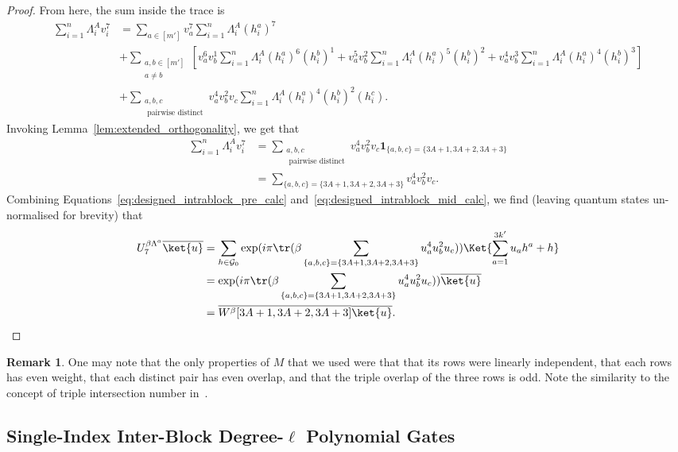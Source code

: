 \documentclass[11pt]{article}
\theoremstyle{definition}
\newtheorem{remark}[theorem]{Remark}
\newcommand{\cG}{\mathcal{G}}
\newcommand{\one}{\boldsymbol{1}}
\newcommand*{\ol}{\overline}
\begin{document}
\begin{proof}
From here, the sum inside the trace is
\begin{align}
    \sum_{i=1}^n\Lambda^A_i
     v_i^7
     &= \sum_{a\in [m']} v_a^7 \sum_{i=1}^n\Lambda^A_i(h^a_i)^7  \\
     &+ \sum_{\substack{a,b \in [m']\\a \neq b}}\left[v_a^6v_b^1 \sum_{i=1}^n\Lambda^A_i(h^a_i)^6(h^b_i)^1 + v_a^5v_b^2 \sum_{i=1}^n\Lambda^A_i(h^a_i)^5(h^b_i)^2 + 
    v_a^4v_b^3 \sum_{i=1}^n\Lambda^A_i(h^a_i)^4(h^b_i)^3\right] \\
    &+ \sum_{\substack{a,b,c \\\text{ pairwise distinct}}}v_a^4v_b^2v_c \sum_{i=1}^n\Lambda^A_i(h^a_i)^4(h^b_i)^2(h^c_i).
\end{align}
Invoking Lemma~\ref{lem:extended_orthogonality}, we get that 
\begin{align}
    \sum_{i=1}^n\Lambda^A_i
     v_i^7
     &=  \sum_{\substack{a,b,c \\\text{ pairwise distinct}}}v_a^4v_b^2v_c \one_{\{a,b,c\} = \{3A+1,3A+2,3A+3\}} \\
     &= \sum_{\{a,b,c\} = \{3A+1,3A+2,3A+3\}}v_a^4v_b^2v_c.\label{eq:designed_intrablock_mid_calc}
\end{align}
Combining Equations~\eqref{eq:designed_intrablock_pre_calc} and~\eqref{eq:designed_intrablock_mid_calc}, we find (leaving quantum states un-normalised for brevity) that
\begin{align}
    U_7^{\beta \Lambda^a}\ol{\ket{u}}
    &= \sum_{h\in \cG_0} 
     \exp(i\pi \tr( \beta \sum_{\{a,b,c\} = \{3A+1,3A+2,3A+3\}}u_a^4u_b^2u_c
     ))
    \Ket{\sum_{a=1}^{3k'} u_{a}h^{a} + h} \\
    &= \exp(i\pi \tr( \beta \sum_{\{a,b,c\} = \{3A+1,3A+2,3A+3\}}u_a^4u_b^2u_c
     )) \ol{\ket{u}}\\
     &= \ol{W^\beta [3A+1, 3A+2, 3A+3]} \ol{\ket{u}}. \qedhere
\end{align}
\end{proof}

\begin{remark}
    One may note that the only properties of $M$ that we used were that that its rows were linearly independent, that each rows has even weight, that each distinct pair has even overlap, and that the triple overlap of the three rows is odd. Note the similarity to the concept of triple intersection number in~\cite{zhu2023non}.
\end{remark}



\subsection{Single-Index Inter-Block Degree-\texorpdfstring{$\ell$}{} Polynomial Gates}\label{sec:address_ortho_poly_gates}
\end{document}
